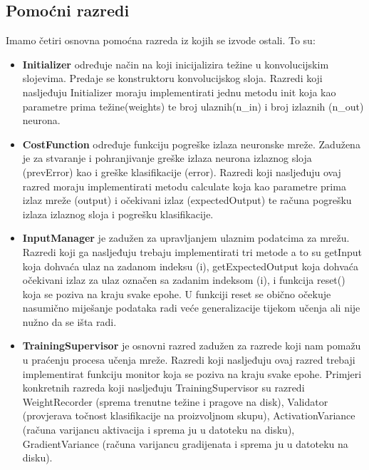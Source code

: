 \documentclass[times, utf8, zavrsni]{fer}
\begin{document}
\subsection{Pomoćni razredi}
Imamo četiri osnovna pomoćna razreda iz kojih se izvode ostali. To su:
\begin{itemize}
\item \textbf{Initializer} određuje način na koji inicijalizira težine u konvolucijskim slojevima. Predaje se konstruktoru konvolucijskog sloja. Razredi koji nasljeđuju Initializer moraju implementirati jednu metodu init koja kao parametre prima težine(weights) te broj ulaznih(n\_in) i broj izlaznih (n\_out) neurona.
\item \textbf{CostFunction} određuje funkciju pogreške izlaza neuronske mreže. Zadužena je za stvaranje i pohranjivanje greške izlaza neurona izlaznog sloja (prevError) kao i greške klasifikacije (error). Razredi koji nasljeđuju ovaj razred moraju implementirati metodu calculate koja kao parametre prima izlaz mreže (output) i očekivani izlaz (expectedOutput) te računa pogrešku izlaza izlaznog sloja i pogrešku klasifikacije.
\item \textbf{InputManager} je zadužen za upravljanjem ulaznim podatcima za mrežu. Razredi koji ga nasljeđuju trebaju implementirati tri metode a to su getInput koja dohvaća ulaz na zadanom indeksu (i), getExpectedOutput koja dohvaća očekivani izlaz za ulaz označen sa zadanim indeksom (i), i funkcija reset() koja se poziva na kraju svake epohe. U funkciji reset se obično očekuje nasumično miješanje podataka radi veće generalizacije tijekom učenja ali nije nužno da se išta radi.
\item \textbf{TrainingSupervisor} je osnovni razred zadužen za razrede koji nam pomažu u praćenju procesa učenja mreže. Razredi koji nasljeđuju ovaj razred trebaji implementirat funkciju monitor koja se poziva na kraju svake epohe. Primjeri konkretnih razreda koji nasljeđuju TrainingSupervisor su razredi WeightRecorder (sprema trenutne težine i pragove na disk), Validator (provjerava točnost klasifikacije na proizvoljnom skupu), ActivationVariance (računa varijancu aktivacija i sprema ju u datoteku na disku), GradientVariance (računa varijancu gradijenata i sprema ju u datoteku na disku).
\end{itemize}
\end{document}
